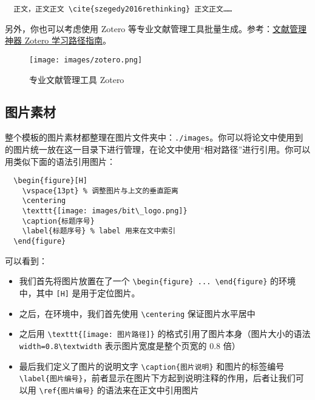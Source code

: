 \begin{verbatim}
  正文，正文正文 \cite{szegedy2016rethinking} 正文正文……
\end{verbatim}

另外，你也可以考虑使用 Zotero 等专业文献管理工具批量生成。参考：\href{https://sspai.com/post/56724}{文献管理神器 Zotero 学习路径指南}。

\begin{figure}[H]
  \center
  \texttt{[image: images/zotero.png]}
  \caption{专业文献管理工具 Zotero}
\end{figure}

\subsection{图片素材}

整个模板的图片素材都整理在图片文件夹中：\texttt{./images}。你可以将论文中使用到的图片统一放在这一目录下进行管理，在论文中使用“相对路径”进行引用。你可以用类似下面的语法引用图片：

\begin{verbatim}
  \begin{figure}[H]
    \vspace{13pt} % 调整图片与上文的垂直距离
    \centering
    \texttt{[image: images/bit\_logo.png]}
    \caption{标题序号}
    \label{标题序号} % label 用来在文中索引
  \end{figure}
\end{verbatim}

可以看到：

\begin{itemize}
  \item 我们首先将图片放置在了一个 \verb|\begin{figure} ... \end{figure}| 的环境中，其中 \texttt{[H]} 是用于定位图片。
  \item 之后，在环境中，我们首先使用 \verb|\centering| 保证图片水平居中
  \item 之后用 \verb|\texttt{[image: 图片路径]}| 的格式引用了图片本身（图片大小的语法 \verb|width=0.8\textwidth| 表示图片宽度是整个页宽的 0.8 倍）
  \item 最后我们定义了图片的说明文字 \verb|\caption{图片说明}| 和图片的标签编号 \verb|\label{图片编号}|，前者显示在图片下方起到说明注释的作用，后者让我们可以用 \verb|\ref{图片编号}| 的语法来在正文中引用图片
\end{itemize}

